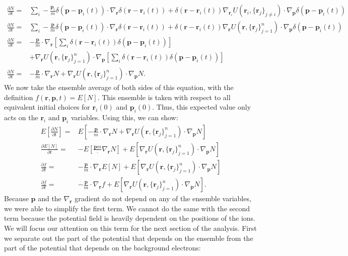 \documentclass{article}
\begin{document}
\begin{align*}
\frac{\partial N}{\partial t}=&\sum_i-\frac{\mathbf{p}_i}{m}\delta(\mathbf{p}-\mathbf{p}_i(t))\cdot\nabla_\mathbf{r}\delta(\mathbf{r}-\mathbf{r}_i(t))+\delta(\mathbf{r}-\mathbf{r}_i(t))\nabla_{\mathbf{r}_i}U\left(\mathbf{r}_i,\{\mathbf{r}_j\}_{j\neq i}\right)\cdot \nabla_\mathbf{p}\delta(\mathbf{p}-\mathbf{p}_i(t))\\
\frac{\partial N}{\partial t}=&\sum_i-\frac{\mathbf{p}}{m}\delta(\mathbf{p}-\mathbf{p}_i(t))\cdot\nabla_\mathbf{r}\delta(\mathbf{r}-\mathbf{r}_i(t))+\delta(\mathbf{r}-\mathbf{r}_i(t))\nabla_{\mathbf{r}}U\left(\mathbf{r},\{\mathbf{r}_j\}_{j=1}^n\right)\cdot \nabla_\mathbf{p}\delta(\mathbf{p}-\mathbf{p}_i(t))\\
\frac{\partial N}{\partial t}=&-\frac{\mathbf{p}}{m}\cdot \nabla_\mathbf{r}\left[\sum_i\delta(\mathbf{r}-\mathbf{r}_i(t))\delta(\mathbf{p}-\mathbf{p}_i(t))\right]\\&+\nabla_\mathbf{r}U\left(\mathbf{r},\{\mathbf{r}_j\}_{j=1}^n\right)\cdot\nabla_\mathbf{p}\left[\sum_i\delta(\mathbf{r}-\mathbf{r}_i(t))\delta(\mathbf{p}-\mathbf{p}_i(t))\right]\\
\frac{\partial N}{\partial t}=&-\frac{\mathbf{p}}{m}\cdot\nabla_\mathbf{r} N+\nabla_\mathbf{r} U\left(\mathbf{r},\{\mathbf{r}_j\}_{j=1}^n\right)\cdot \nabla_\mathbf{p}N.
\end{align*}We now take the ensemble average of both sides of this equation, with the definition $f(\mathbf{r},\mathbf{p},t)=E[N]$. This ensemble is taken with respect to all equivalent initial choices for $\mathbf{r}_i(0)$ and $\mathbf{p}_i(0)$. Thus, this expected value only acts on the $\mathbf{r}_i$ and $\mathbf{p}_i$ variables. Using this, we can show:
\begin{align*}
E\left[\frac{\partial N}{\partial t}\right]=&E\left[-\frac{\mathbf{p}}{m}\cdot \nabla_\mathbf{r} N+\nabla_\mathbf{r} U\left(\mathbf{r},\{\mathbf{r}_j\}_{j=1}^n\right)\cdot \nabla_\mathbf{p} N\right]\\
\frac{\partial E[N]}{\partial t}=&-E\left[\frac{\mathbf{p}{m}}\cdot \nabla_\mathbf{r}N\right]+E\left[\nabla_\mathbf{r} U\left(\mathbf{r},\{\mathbf{r}_j\}_{j=1}^n\right)\cdot\nabla_\mathbf{p}N\right]\\
\frac{\partial f}{\partial t}=&-\frac{\mathbf{p}}{m}\cdot\nabla_\mathbf{r}E[N]+E\left[\nabla_\mathbf{r} U\left(\mathbf{r},\{\mathbf{r}_j\}_{j=1}^n\right)\cdot \nabla_\mathbf{p}N\right]\\
\frac{\partial f}{\partial t}=&-\frac{\mathbf{p}}{m}\cdot\nabla_\mathbf{r} f+E\left[\nabla_\mathbf{r} U\left(\mathbf{r},\{\mathbf{r}_j\}_{j=1}^n\right)\cdot\nabla_\mathbf{p}N\right].
\end{align*}Because $\mathbf{p}$ and the $\nabla_\mathbf{r}$ gradient do not depend on any of the ensemble variables, we were able to simplify the first term. We cannot do the same with the second term because the potential field is heavily dependent on the positions of the ions. We will focus our attention on this term for the next section of the analysis. First we separate out the part of the potential that depends on the ensemble from the part of the potential that depends on the background electrons:
\end{document}
